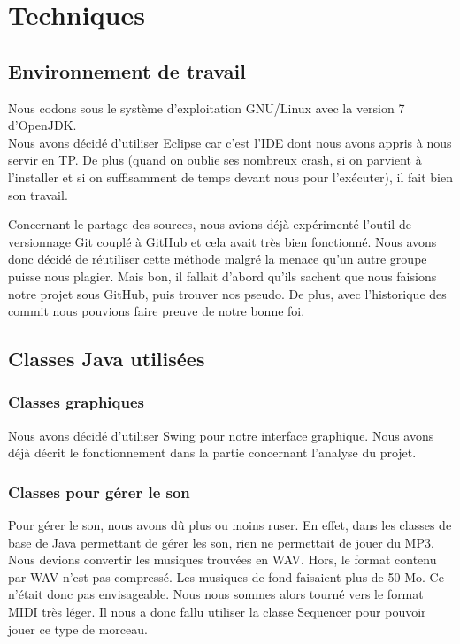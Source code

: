 \documentclass{article}
\begin{document}
\section{Techniques}
  \subsection{Environnement de travail}
  Nous codons sous le système d'exploitation GNU/Linux avec la version 7 d'OpenJDK. \\
  Nous avons décidé d'utiliser Eclipse car c'est l'IDE dont nous avons appris à nous servir en TP.
  De plus (quand on oublie ses nombreux crash, si on parvient à l'installer et si on suffisamment de temps devant nous pour l'exécuter), il fait bien son travail.
  
  Concernant le partage des sources, nous avions déjà expérimenté l'outil de versionnage Git couplé à GitHub et cela avait très bien fonctionné.
  Nous avons donc décidé de réutiliser cette méthode malgré la menace qu'un autre groupe puisse nous plagier. 
  Mais bon, il fallait d'abord qu'ils sachent que nous faisions notre projet sous GitHub, puis trouver nos pseudo.
  De plus, avec l'historique des commit nous pouvions faire preuve de notre bonne foi.


\subsection{Classes Java utilisées}
  \subsubsection{Classes graphiques} Nous avons décidé d'utiliser Swing pour notre interface graphique.
  Nous avons déjà décrit le fonctionnement dans la partie concernant l'analyse du projet.
  
  \subsubsection{Classes pour gérer le son}
  Pour gérer le son, nous avons dû plus ou moins ruser.
  En effet, dans les classes de base de Java permettant de gérer les son, rien ne permettait de jouer du MP3.
  Nous devions convertir les musiques trouvées en WAV. Hors, le format contenu par WAV n'est pas compressé.
  Les musiques de fond faisaient plus de 50 Mo. Ce n'était donc pas envisageable.
  Nous nous sommes alors tourné vers le format MIDI très léger.
  Il nous a donc fallu utiliser la classe Sequencer pour pouvoir jouer ce type de morceau.
  
\end{document}
